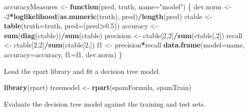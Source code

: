 \documentclass[]{article}
\newenvironment{Shaded}{\begin{snugshade}}{\end{snugshade}}
\newcommand{\ControlFlowTok}[1]{\textcolor[rgb]{0.13,0.29,0.53}{\textbf{#1}}}
\newcommand{\DataTypeTok}[1]{\textcolor[rgb]{0.13,0.29,0.53}{#1}}
\newcommand{\DecValTok}[1]{\textcolor[rgb]{0.00,0.00,0.81}{#1}}
\newcommand{\FloatTok}[1]{\textcolor[rgb]{0.00,0.00,0.81}{#1}}
\newcommand{\KeywordTok}[1]{\textcolor[rgb]{0.13,0.29,0.53}{\textbf{#1}}}
\newcommand{\NormalTok}[1]{#1}
\newcommand{\OperatorTok}[1]{\textcolor[rgb]{0.81,0.36,0.00}{\textbf{#1}}}
\newcommand{\StringTok}[1]{\textcolor[rgb]{0.31,0.60,0.02}{#1}}
\begin{document}
\begin{Shaded}
\begin{Highlighting}[]
\NormalTok{accuracyMeasures <-}\StringTok{ }\ControlFlowTok{function}\NormalTok{(pred, truth, }\DataTypeTok{name=}\StringTok{"model"}\NormalTok{) \{}
\NormalTok{dev.norm <-}\StringTok{ }\DecValTok{-2}\OperatorTok{*}\KeywordTok{loglikelihood}\NormalTok{(}\KeywordTok{as.numeric}\NormalTok{(truth), pred)}\OperatorTok{/}\KeywordTok{length}\NormalTok{(pred)}
\NormalTok{ctable <-}\StringTok{ }\KeywordTok{table}\NormalTok{(}\DataTypeTok{truth=}\NormalTok{truth,}
\DataTypeTok{pred=}\NormalTok{(pred}\OperatorTok{>}\FloatTok{0.5}\NormalTok{))}
\NormalTok{accuracy <-}\StringTok{ }\KeywordTok{sum}\NormalTok{(}\KeywordTok{diag}\NormalTok{(ctable))}\OperatorTok{/}\KeywordTok{sum}\NormalTok{(ctable)}
\NormalTok{precision <-}\StringTok{ }\NormalTok{ctable[}\DecValTok{2}\NormalTok{,}\DecValTok{2}\NormalTok{]}\OperatorTok{/}\KeywordTok{sum}\NormalTok{(ctable[,}\DecValTok{2}\NormalTok{])}
\NormalTok{recall <-}\StringTok{ }\NormalTok{ctable[}\DecValTok{2}\NormalTok{,}\DecValTok{2}\NormalTok{]}\OperatorTok{/}\KeywordTok{sum}\NormalTok{(ctable[}\DecValTok{2}\NormalTok{,])}
\NormalTok{f1 <-}\StringTok{ }\NormalTok{precision}\OperatorTok{*}\NormalTok{recall}
\KeywordTok{data.frame}\NormalTok{(}\DataTypeTok{model=}\NormalTok{name, }\DataTypeTok{accuracy=}\NormalTok{accuracy, }\DataTypeTok{f1=}\NormalTok{f1, dev.norm)}
\NormalTok{\}}
\end{Highlighting}
\end{Shaded}

Load the rpart library and fit a decision tree model.

\begin{Shaded}
\begin{Highlighting}[]
\KeywordTok{library}\NormalTok{(rpart)}
\NormalTok{treemodel <-}\StringTok{ }\KeywordTok{rpart}\NormalTok{(spamFormula, spamTrain)}
\end{Highlighting}
\end{Shaded}

Evaluate the decision tree model against the training and test sets.

\begin{Shaded}
\end{Shaded}
\end{document}
